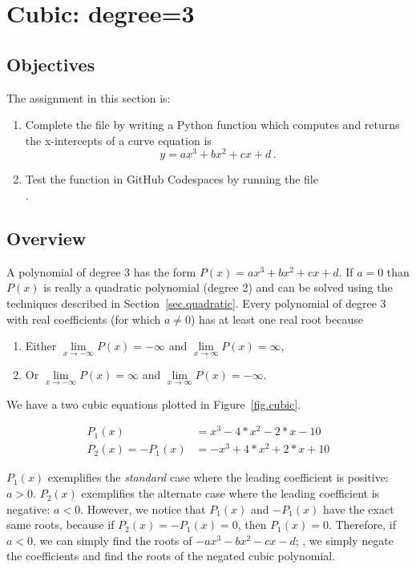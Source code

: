 \section{Cubic: degree=3}
\label{sec.cubic}

\subsection{Objectives}
The assignment in this section is:
\begin{enumerate}
\item Complete the file  by writing a Python
  function which computes and returns the x-intercepts of a curve
  equation is \[y=a x^3 + b x^2 + c x + d\,.\]
\item Test the function in GitHub Codespaces by running the file\\
  .
\end{enumerate}

\subsection{Overview}


A polynomial of degree 3 has the form $P(x) = a x^3 + b x^2 + c x + d$. If $a=0$ than $P(x)$ is really
a quadratic polynomial (degree 2) and can be solved using the techniques described in Section~\ref{sec.quadratic}.  Every polynomial of degree 3
with real coefficients (for which $a\neq 0$) has at least one real root because 
\begin{enumerate}
\item Either $\lim\limits_{x\to-\infty}P(x) = -\infty$ and $\lim\limits_{x\to\infty}P(x) = \infty$,
  \item Or $\lim\limits_{x\to-\infty}P(x) = \infty$ and $\lim\limits_{x\to\infty}P(x) = -\infty$.
\end{enumerate}


We have a two cubic equations plotted in Figure~\ref{fig.cubic}.

\begin{align*}
  P_1(x) &= x^3 - 4*x^2 - 2*x - 10\\
  P_2(x) = -P_1(x) &= -x^3 + 4*x^2 + 2*x + 10
\end{align*}

$P_1(x)$ exemplifies the \emph{standard} case where the leading coefficient is positive: $a>0$.
$P_2(x)$ exemplifies the alternate case where the leading coefficient is negative: $a<0$.
However, we notice that $P_1(x)$ and $-P_1(x)$ have the exact same roots, because if $P_2(x) = -P_1(x) = 0$,
then $P_1(x) = 0$.  Therefore, if $a<0$, we can simply find the roots of $-a x^3 -b x^2 - c x - d$;
\ie, we simply negate the coefficients and find the roots of the negated cubic polynomial.


